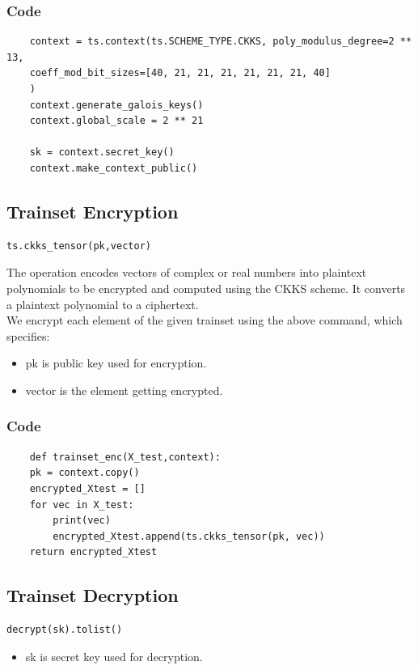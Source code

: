 \documentclass[11pt]{article}
\begin{document}
\subsubsection{Code}
\begin{lstlisting}
    context = ts.context(ts.SCHEME_TYPE.CKKS, poly_modulus_degree=2 ** 13,
    coeff_mod_bit_sizes=[40, 21, 21, 21, 21, 21, 21, 40]
    )
    context.generate_galois_keys()
    context.global_scale = 2 ** 21

    sk = context.secret_key()
    context.make_context_public()
\end{lstlisting}

\subsection{Trainset Encryption}
\begin{lstlisting}
ts.ckks_tensor(pk,vector)
\end{lstlisting}
The operation encodes vectors of complex or real numbers into plaintext polynomials to be encrypted and computed using the CKKS scheme. It converts a plaintext polynomial to a ciphertext.\\
We encrypt each element of the given trainset using the above command, which specifies:
\begin{itemize}
    \item pk is public key used for encryption.
    \item vector is the element getting encrypted.
\end{itemize}

\subsubsection{Code}
\begin{lstlisting}
    def trainset_enc(X_test,context):
    pk = context.copy()
    encrypted_Xtest = []
    for vec in X_test:
        print(vec)
        encrypted_Xtest.append(ts.ckks_tensor(pk, vec))
    return encrypted_Xtest
\end{lstlisting}

\subsection{Trainset Decryption}
\begin{lstlisting}
decrypt(sk).tolist()
\end{lstlisting}
\begin{itemize}
    \item sk is secret key used for decryption.
\end{itemize}
\end{document}
